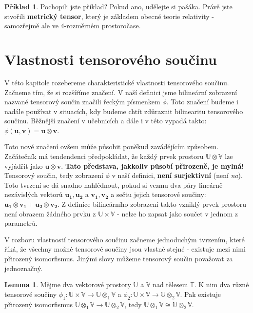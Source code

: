 \documentclass[a5paper,12pt]{amsbook}
\theoremstyle{definition}
\newtheorem{example}{Příklad}[chapter]
\newtheorem{lemma}[theorem]{Lemma}
\newcommand{\myvec}[1]{\mathbf{#1}}
\newcommand{\myspace}[1]{\mathbb{#1}}
\begin{document}
\begin{example}
\medskip\noindent
Pochopili jste příklad? Pokud ano, udělejte si pašáka. Právě jste stvořili
\textbf{metrický tensor}, který je základem obecné teorie relativity - samozřejmě
ale ve 4-rozměrném prostoročase.
\end{example}

\section{Vlastnosti tensorového součinu}

\noindent
V této kapitole rozebereme charakteristické vlastnosti tensorového součinu. Začneme tím, že si rozšíříme
značení. V naší definici jsme bilineární zobrazení nazvané tensorový součin značili řeckým písmenkem
$\phi$. Toto značení budeme i nadále používat v situacích, kdy budeme chtít zdůraznit bilinearitu
tensorového součinu. Běžnější značení v učebnicích a dále i v této vypadá takto: $\phi(\myvec{u}, \myvec{v}) = \myvec{u}\otimes\myvec{v}$.

Toto nové značení ovšem může působit poněkud zavádějícím způsobem. Začátečník má tendendenci předpokládat,
že každý prvek prostoru $\myspace{U}\otimes\myspace{V}$ lze vyjádřit jako $\myvec{u}\otimes\myvec{v}$.
\textbf{Tato představa, jakkoliv působí přirozeně, je mylná!} Tensorový součin, tedy zobrazení $\phi$
v naší definici, \textbf{není surjektivní} (není \textit{na}). Toto tvrzení se dá snadno nahlédnout,
pokud si vezmu dva páry lineárně nezávislých vektorů $\myvec{u_1}, \myvec{u_2}$ a $\myvec{v_1}, \myvec{v_2}$
a sečtu jejich tensorové součiny: $\myvec{u_1}\otimes\myvec{v_1} + \myvec{u_2}\otimes\myvec{v_2}$.
Z definice bilineárního zobrazení takto vzniklý prvek prostoru není obrazem žádného prvku z
$\myspace{U}\times\myspace{V}$ - nelze ho zapsat jako součet v jednom z parametrů.

\medskip\noindent
V rozboru vlastností tensorového součinu začneme jednoduchým tvrzením, které říká, že všechny možné
tensorové součiny jsou vlastně stejné - existuje mezi nimi přirozený isomorfismus. Jinými slovy
můžeme tensorový součin považovat za jednoznačný.

\begin{lemma}
Mějme dva vektorové prostory $\myspace{U}$ a $\myspace{V}$ nad tělesem $\myspace{T}$. K nim dva
různé tensorové součiny $\phi_1: \myspace{U}\times\myspace{V}\rightarrow\myspace{U}\otimes_1\myspace{V}$
a $\phi_2: \myspace{U}\times\myspace{V}\rightarrow\myspace{U}\otimes_2\myspace{V}$. Pak existuje
přirozený isomorfismus $\myspace{U}\otimes_1\myspace{V}\rightarrow\myspace{U}\otimes_2\myspace{V}$,
tedy $\myspace{U}\otimes_1\myspace{V}\cong\myspace{U}\otimes_2\myspace{V}$.
\end{lemma}
\end{document}
